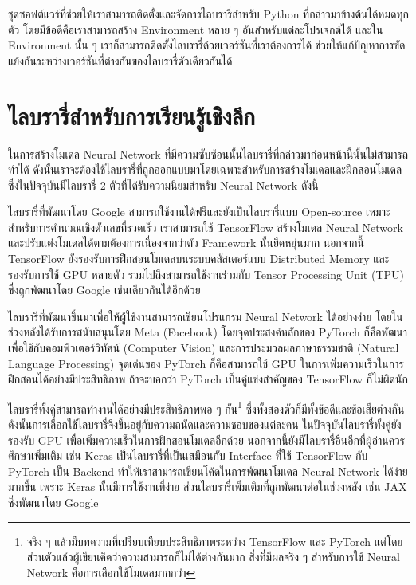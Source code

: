 \begin{description}[topsep=0pt,noitemsep]
    \item[Anaconda] ชุดซอฟต์แวร์ที่ช่วยให้เราสามารถติดตั้งและจัดการไลบรารี่สำหรับ Python ที่กล่าวมาข้างต้นได้หมดทุกตัว โดยมีข้อดีคือเราสามารถสร้าง Environment หลาย ๆ อันสำหรับแต่ละโปรเจกต์ได้ และใน Environment นั้น ๆ เราก็สามารถติดตั้งไลบรารี่ด้วยเวอร์ชันที่เราต้องการได้ ช่วยให้แก้ปัญหาการขัดแย้งกันระหว่างเวอร์ชันที่ต่างกันของไลบรารี่ตัวเดียวกันได้
\end{description}

\section{ไลบรารี่สำหรับการเรียนรู้เชิงลึก}
\label{sec:lib_dl}

ในการสร้างโมเดล Neural Network ที่มีความซับซ้อนนั้นไลบรารี่ที่กล่าวมาก่อนหน้านี้นั้นไม่สามารถทำได้ ดังนั้นเราจะต้องใช้ไลบรารี่ที่ถูกออกแบบมาโดยเฉพาะสำหรับการสร้างโมเดลและฝึกสอนโมเดล ซึ่งในปัจจุบันมีไลบรารี่ 2 ตัวที่ได้รับความนิยมสำหรับ Neural Network ดังนี้
%
\begin{description}[topsep=0pt,noitemsep]\setlength\itemsep{0.5em}
    \item[TensorFlow] ไลบรารี่ที่พัฒนาโดย Google สามารถใช้งานได้ฟรีและยังเป็นไลบรารี่แบบ Open-source เหมาะสำหรับการคำนวณเชิงตัวเลขที่รวดเร็ว เราสามารถใช้ TensorFlow สร้างโมเดล Neural Network และปรับแต่งโมเดลได้ตามต้องการเนื่องจากว่าตัว Framework นั้นยืดหยุ่นมาก นอกจากนี้ TensorFlow ยังรองรับการฝึกสอนโมเดลบนระบบคลัสเตอร์แบบ Distributed Memory และรองรับการใช้ GPU หลายตัว รวมไปถึงสามารถใช้งานร่วมกับ Tensor Processing Unit (TPU) ซึ่งถูกพัฒนาโดย Google เช่นเดียวกันได้อีกด้วย

    \item[PyTorch] ไลบรารีที่พัฒนาขึ้นมาเพื่อให้ผู้ใช้งานสามารถเขียนโปรแกรม Neural Network ได้อย่างง่าย โดยในช่วงหลังได้รับการสนับสนุนโดย Meta (Facebook) โดยจุดประสงค์หลักของ PyTorch ก็คือพัฒนาเพื่อใช้กับคอมพิวเตอร์วิทัศน์ (Computer Vision) และการประมวลผลภาษาธรรมชาติ (Natural Language Processing) จุดเด่นของ PyTorch ก็คือสามารถใช้ GPU ในการเพิ่มความเร็วในการฝึกสอนได้อย่างมีประสิทธิภาพ ถ้าจะบอกว่า PyTorch เป็นคู่แข่งสำคัญของ TensorFlow ก็ไม่ผิดนัก
\end{description}

ไลบรารี่ทั้งคู่สามารถทำงานได้อย่างมีประสิทธิภาพพอ ๆ กัน\footnote{จริง ๆ แล้วมีบทความที่เปรียบเทียบประสิทธิภาพระหว่าง TensorFlow และ PyTorch แต่โดยส่วนตัวแล้วผู้เขียนคิดว่าความสามารถก็ไม่ได้ต่างกันมาก สิ่งที่มีผลจริง ๆ สำหรับการใช้ Neural Network คือการเลือกใช้โมเดลมากกว่า} ซึ่งทั้งสองตัวก็มีทั้งข้อดีและข้อเสียต่างกัน ดังนั้นการเลือกใช้ไลบรารี่จึงขึ้นอยู่กับความถนัดและความชอบของแต่ละคน ในปัจจุบันไลบรารี่ทั้งคู่ยังรองรับ GPU เพื่อเพิ่มความเร็วในการฝึกสอนโมเดลอีกด้วย นอกจากนี้ยังมีไลบรารี่อื่นอีกที่ผู้อ่านควรศึกษาเพิ่มเติม เช่น Keras เป็นไลบรารี่ที่เป็นเสมือนกับ Interface ที่ใช้ TensorFlow กับ PyTorch เป็น Backend ทำให้เราสามารถเขียนโค้ดในการพัฒนาโมเดล Neural Network ได้ง่ายมากขึ้น เพราะ Keras นั้นมีการใช้งานที่ง่าย ส่วนไลบรารี่เพิ่มเติมที่ถูกพัฒนาต่อในช่วงหลัง เช่น JAX ซึ่งพัฒนาโดย Google

